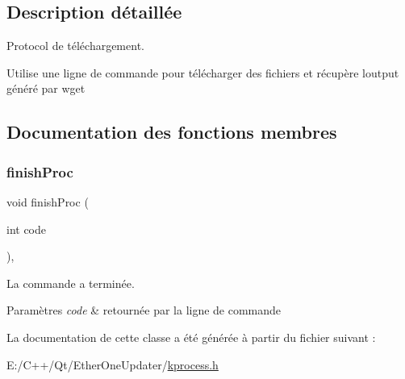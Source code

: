 \subsection{Description détaillée}
Protocol de téléchargement. 

Utilise une ligne de commande pour télécharger des fichiers et récupère l\textquotesingle{}output généré par wget 

\subsection{Documentation des fonctions membres}
\mbox{\label{classkProcess_aa9353ddae96a106044fa299ae2378087}} 
\subsubsection{\texorpdfstring{finish\+Proc}{finishProc}}
{\footnotesize\ttfamily void finish\+Proc (\begin{DoxyParamCaption}\item[{int}]{code }\end{DoxyParamCaption})\hspace{0.3cm}{\ttfamily [inline]}, {\ttfamily [slot]}}



La commande a terminée. 


\begin{DoxyParams}{Paramètres}
{\em code} & retournée par la ligne de commande \\
\hline
\end{DoxyParams}


La documentation de cette classe a été générée à partir du fichier suivant \+:\begin{DoxyCompactItemize}
\item 
E\+:/\+C++/\+Qt/\+Ether\+One\+Updater/\hyperlink{kprocess_8h}{kprocess.\+h}\end{DoxyCompactItemize}
